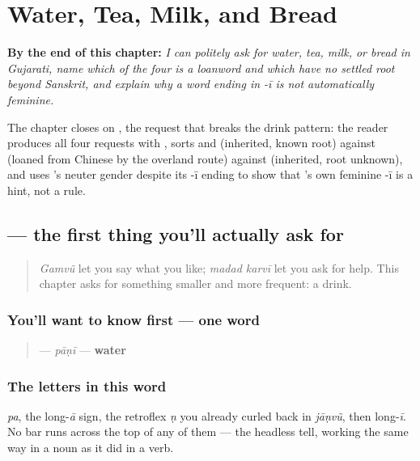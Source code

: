 
\chapter{Water, Tea, Milk, and Bread}
\label{ch:gu-request-food-drink}

\begin{chapteropening}
\textbf{By the end of this chapter:} \emph{I can politely ask for water, tea, milk, or bread in Gujarati, name which of the four is a loanword and which have no settled root beyond Sanskrit, and explain why a word ending in -ī is not automatically feminine.}

The chapter closes on , the request that breaks the drink pattern: the reader produces all four requests with  , sorts  and  (inherited, known root) against  (loaned from Chinese by the overland route) against  (inherited, root unknown), and uses 's neuter gender despite its -ī ending to show that 's own feminine -ī is a hint, not a rule.
\end{chapteropening}

\section[pāṇī]{ — the first thing you'll actually ask for}

\label{lesson:GU-C10-paani}



\begin{quote}
\emph{Gamvũ} let you say what you like; \emph{madad karvī} let you ask for help. This chapter asks for something smaller and more frequent: a drink.
\end{quote}

\subsection*{You'll want to know first — one word}
\begin{quote}
\textbf{} — \emph{pāṇī} — \textbf{water}
\end{quote}

\subsection*{The letters in this word}
\textbf{} \emph{pa}, \textbf{} the long-\emph{ā} sign, \textbf{} the retroflex \emph{ṇ} you already curled back in \emph{jāṇvũ}, then \textbf{} long-\emph{ī}. No bar runs across the top of any of them — the headless tell, working the same way in a noun as it did in a verb.

